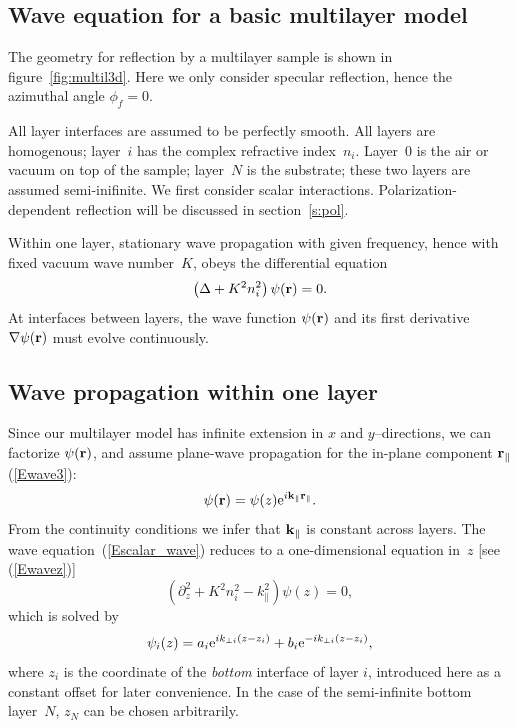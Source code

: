 \subsection{Wave equation for a basic multilayer model}

The geometry for reflection by a multilayer sample is shown in figure~\ref{fig:multil3d}. Here we only consider specular reflection, hence the azimuthal angle $\phi_f = 0$.

All layer interfaces are assumed to be perfectly smooth.
All layers are homogenous; layer~$i$ has the complex refractive index~$n_i$.
Layer~0 is the air or vacuum on top of the sample;
layer~$N$ is the substrate; these two layers are assumed semi-inifinite.
We first consider scalar interactions.
Polarization-dependent reflection
will be discussed in section~\ref{s:pol}. 

Within one layer,
stationary wave propagation with given frequency,
hence with fixed vacuum wave number~$K$,
obeys the differential equation
\begin{equation}\label{Escalar_wave}
\left(\Delta + K^2 n_i^2 \right) \psi(\mathbf{r}) = 0.
\end{equation}
At interfaces between layers,
the wave function $\psi(\mathbf{r})$ and its first derivative
$\mathbf{\nabla}\psi(\mathbf{r})$ must evolve continuously.


\subsection{Wave propagation within one layer}

Since our multilayer model has infinite extension
in $x$ and $y$--directions, we can factorize
$\psi(\mathbf{r})$, and assume plane-wave propagation for
the in-plane component $\mathbf{r}_\parallel$ (\ref{Ewave3}):
\begin{equation}\label{Ewave3dup}
\psi(\mathbf{r}) = \psi(z) \text{e}^{i \mathbf{k}_\parallel\mathbf{r}_\parallel}.
\end{equation}
From the continuity conditions we infer that $\mathbf{k}_\parallel$
is constant across layers.
The wave equation~(\ref{Escalar_wave})
reduces to a one-dimensional equation in~$z$ [see (\ref{Ewavez})]
\begin{equation}\label{Ewavezdup}
\left(\partial_z^2 + K^2n_i^2 - k_\parallel^2 \right) \psi(z) = 0,
\end{equation}
which is solved by
\begin{equation}\label{Epsiz}
  \psi_i(z) = a_i\text{e}^{ik_{\perp i}(z-z_i)} + b_i\text{e}^{-ik_{\perp i}(z-z_i)},
\end{equation}
where $z_i$ is the coordinate of the \textit{bottom} interface
of layer $i$,
introduced here as a constant offset for later convenience.
In the case of the semi-infinite bottom layer~$N$,
$z_N$ can be chosen arbitrarily.

